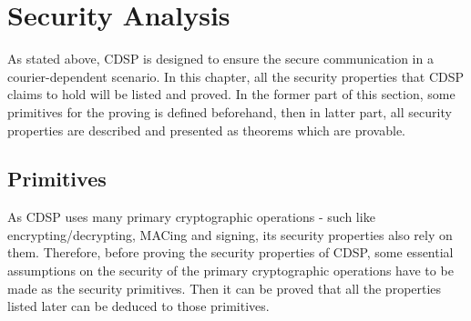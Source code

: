 \chapter{Security Analysis}
As stated above, CDSP is designed to ensure the secure communication in a courier-dependent scenario. In this chapter, all the security properties that CDSP claims to hold will be listed and proved. In the former part of this section, some primitives for the proving is defined beforehand, then in latter part, all security properties are described and presented as theorems which are provable.

\section{Primitives}
\label{primitives}
As CDSP uses many primary cryptographic operations - such like encrypting/decrypting, MACing and signing, its security properties also rely on them. Therefore, before proving the security properties of CDSP, some essential assumptions on the security of the primary cryptographic operations have to be made as the security primitives. Then it can be proved that all the properties listed later can be deduced to those primitives.
